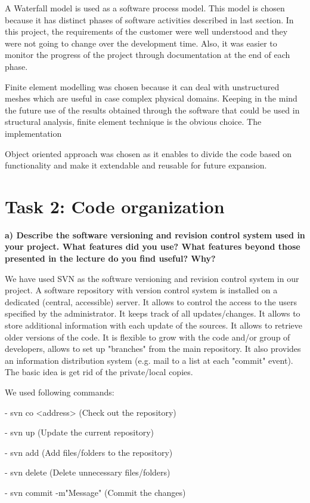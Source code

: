 \documentclass[a4paper, 11pt, oneside]{scrartcl}
\begin{document}
A Waterfall model is used as a software process model. This model is chosen because it has distinct phases of software activities described in last section. In this project, the requirements of the customer were well understood and they were not going to change over the development time. Also, it was easier to monitor the progress of the project through documentation at the end of each phase. 

Finite element modelling was chosen because it can deal with unstructured meshes which are useful in case complex physical domains. Keeping in the mind the future use of the results obtained through the software that could be used in structural analysis, finite element technique is the obvious choice. The implementation 

Object oriented approach was chosen as it enables to divide the code based on functionality and make it extendable and reusable for future expansion.

\section*{Task 2: Code organization}
\textbf{a) Describe the software versioning and revision control system used in your project. What features did you use? What features beyond those presented in the lecture do you find useful? Why?}

We have used SVN as the software versioning and revision control system in our project. A software repository with version control system is installed on a dedicated (central, accessible) server. It allows to control the access to the users specified by the administrator. It keeps track of all updates/changes. It allows to store additional information with each update of the sources. It allows to retrieve older versions of the code. It is flexible to grow with the code and/or group of developers, allows to set up "branches" from the main repository. It also provides an information distribution system (e.g. mail to a list at each "commit" event). The basic idea is get rid of the private/local copies. 

We used following commands:

- svn co <address> (Check out the repository)

- svn up (Update the current repository)

- svn add (Add files/folders to the repository)

- svn delete (Delete unnecessary files/folders)

- svn commit -m"Message" (Commit the changes)
\end{document}
